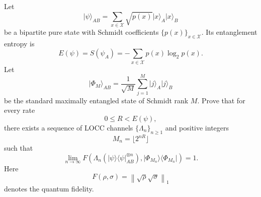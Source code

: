Let
$$
\lvert \psi\rangle_{AB}=\sum_{x\in\mathcal{X}}\sqrt{p(x)}\lvert x\rangle_A\lvert x\rangle_B
$$
be a bipartite pure state with Schmidt coefficients $\{p(x)\}_{x\in\mathcal{X}}$.  Its entanglement entropy is
$$
E(\psi)=S(\psi_A)=-\sum_{x\in\mathcal{X}}p(x)\log_2p(x).
$$
Let
$$
\lvert \Phi_M\rangle_{AB}=\frac{1}{\sqrt M}\sum_{j=1}^{M}\lvert j\rangle_A\lvert j\rangle_B
$$
be the standard maximally entangled state of Schmidt rank $M$.
Prove that for every rate
$$
0\le R<E(\psi),
$$
there exists a sequence of LOCC channels $\{\Lambda_n\}_{n\ge1}$ and positive integers
$$
M_n=\lfloor 2^{nR}\rfloor
$$
such that
$$
\lim_{n\to\infty}F\!\left(
\Lambda_n\!\left(\lvert \psi\rangle\!\langle \psi\rvert_{AB}^{\otimes n}\right),
\lvert \Phi_{M_n}\rangle\!\langle \Phi_{M_n}\rvert
\right)=1.
$$
Here
$$
F(\rho,\sigma)=\left\lVert \sqrt\rho\sqrt\sigma\right\rVert_1
$$
denotes the quantum fidelity.
